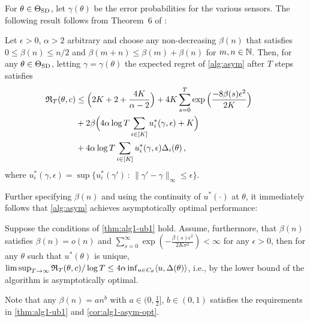 \newcommand{\gap}{d}
\newcommand{\norm}[1]{\|#1\|}
For $\theta \in \Theta_{\mathrm{SD}}$, let $\gamma(\theta)$ be the error probabilities for the various sensors.
The following result follows from Theorem~6 of \cite{WGySz:NIPS15}:
\begin{thm} \label{thm:ftregret}
Let $\epsilon>0$, $\alpha>2$ arbitrary and choose any non-decreasing $\beta(n)$ that satisfies $0\le \beta(n)\le n/2$ and $\beta(m+n)\le \beta(m)+\beta(n)$ for $m,n\in \mathbb{N}$.
Then, 
for any
$\theta\in \Theta_{\mathrm{SD}}$, letting $\gamma = \gamma(\theta)$
the expected regret of \cref{alg:asym} after $T$ steps satisfies 
\begin{align*}
\mathfrak{R}_T(\theta,c)
  &\le  \Big( 2K+2+\frac{4K}{\alpha-2} \Big) 
  +  4K\sum_{s=0}^T \exp{\Big( \frac{-8\beta(s)\epsilon^2}{2K} \Big)}~~~~~ \\
 &+ 2 \beta\Big( 4\alpha\log T\sum_{i\in [K]} u_i^*(\gamma,\epsilon)+K \Big)\\
 & +  4\alpha\log T \sum_{i\in [K]} u_i^*(\gamma,\epsilon)\Delta_i(\theta) \,,
\end{align*}
where $u_i^*(\gamma,\epsilon) = \sup\{u_i^*(\gamma')\,:\, \norm{\gamma'-\gamma}_{\infty}\le \epsilon \}$.
\label{thm:alg1-ub1}
\end{thm}  
Further specifying $\beta(n)$ and using the continuity of $u^*(\cdot)$ at $\theta$, it immediately follows that \cref{alg:asym} achieves asymptotically optimal performance: 
\begin{cor}
\label{cor:alg1-asym-opt}
 Suppose the conditions of \cref{thm:alg1-ub1} hold. Assume, furthermore, that $\beta(n)$ satisfies $\beta(n) = o(n)$ and $\sum_{s=0}^\infty \exp \left( -\frac{\beta(s)\epsilon^2}{2K\sigma^2} \right)<\infty$ for any $\epsilon>0$, then for any $\theta$ such that $u^*(\theta)$ is unique, 
$
\limsup_{T\rightarrow \infty} \mathfrak{R}_T(\theta,c)/\log T \le 4\alpha \inf_{u\in C_\theta} \langle u,\Delta(\theta) \rangle$,
i.e., by the lower bound of  \cite{WGySz:NIPS15} the algorithm is asymptotically optimal.
\end{cor}
Note that any $\beta(n) = an^b$ with $a\in (0,\frac{1}{2}]$, $b\in (0,1)$ satisfies the requirements in \cref{thm:alg1-ub1} and \cref{cor:alg1-asym-opt}.




